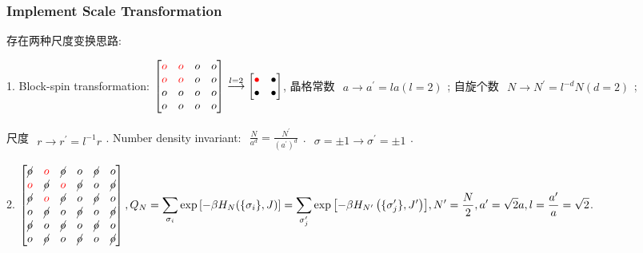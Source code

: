 \documentclass[../../main.tex]{subfiles}
\begin{document}
\subsubsection{Implement Scale Transformation}
存在两种尺度变换思路:

1. Block-spin transformation: $\begin{aligned}
    \begin{bmatrix}
        {\color{red}{o}} & {\color{red}{o}} & o & o  \\
        {\color{red}{o}} & {\color{red}{o}} & o & o  \\
        o & o & o & o  \\
        o & o & o & o
    \end{bmatrix}\stackrel{l=2}{\longrightarrow} \begin{bmatrix}
        {\color{red}{\bullet}} & \bullet \\
        \bullet & \bullet
    \end{bmatrix}
\end{aligned}$, 晶格常数 $\begin{aligned}
    a\rightarrow a^{\prime} = la(l=2)
\end{aligned}$; 自旋个数 $\begin{aligned}
    N\rightarrow N^{\prime} = l^{-d}N(d = 2)
\end{aligned}$; 

尺度 $\begin{aligned}
    r\rightarrow r^{\prime} = l^{-1}r
\end{aligned}$. Number density invariant: $\begin{aligned}
    \frac{N}{a^{d}} = \frac{N^{\prime}}{\left(a^{\prime}\right)^{d}}
\end{aligned}$. $\begin{aligned}
    \sigma = \pm 1\rightarrow \sigma^{\prime} = \pm 1
\end{aligned}$. 

2. $\begin{aligned}
    \begin{bmatrix}
        \cancel{o} & {\color{red}{o}} & \cancel{o} & o & \cancel{o} & o\\
        {\color{red}{o}} & \cancel{o} & {\color{red}{o}} & \cancel{o} & o & \cancel{o}\\
        \cancel{o} & {\color{red}{o}} & \cancel{o} & o & \cancel{o} & o\\
        o & \cancel{o} & o & \cancel{o} & o & \cancel{o}\\
        \cancel{o} & o & \cancel{o} & o & \cancel{o} & o\\
        o & \cancel{o} & o & \cancel{o} & o & \cancel{o}
    \end{bmatrix},Q_{N} = \sum_{\sigma_{i}}\exp{\left[-\beta 
    H_{N}(\{\sigma_{i}\},J)
    \right]} = \sum_{\sigma_{j}^{\prime}}\exp{\left[-\beta 
    H_{N^{\prime}}\left(\{\sigma_{j}^{\prime}\},J^{\prime}\right)
    \right]}, N^{\prime} = \frac{N}{2},a^{\prime} = \sqrt{2}a, l = \frac{a^{\prime}}{a} = \sqrt{2}
\end{aligned}$. 
\end{document}
